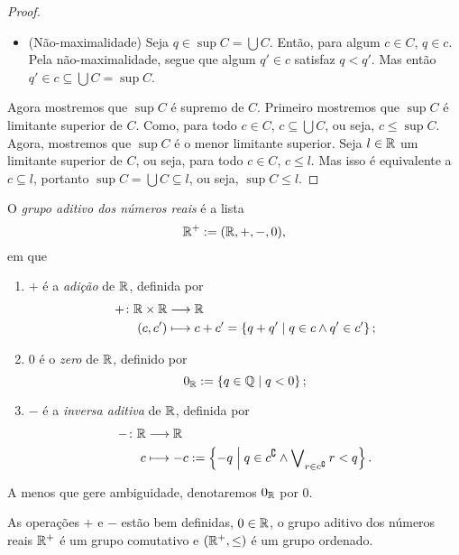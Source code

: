 \begin{proof}
\begin{itemize}
	\item (Não-maximalidade) Seja $q \in \sup C = \bigcup C$. Então, para algum $c \in C$, $q \in c$. Pela não-maximalidade, segue que algum $q' \in c$ satisfaz $q < q'$. Mas então $q' \in c \subseteq \bigcup C = \sup C$.
	\end{itemize}

Agora mostremos que $\sup C$ é supremo de $C$. Primeiro mostremos que $\sup C$ é limitante superior de $C$. Como, para todo $c \in C$, $c \subseteq \bigcup C$, ou seja, $c \leq \sup C$. Agora, mostremos que $\sup C$ é o menor limitante superior. Seja $l \in \mathbb{R}$ um limitante superior de $C$, ou seja, para todo $c \in C$, $c \leq l$. Mas isso é equivalente a $c \subseteq l$, portanto $\sup C = \bigcup C \subseteq l$, ou seja, $\sup C \leq l$.
\end{proof}

\begin{definition}
O \emph{grupo aditivo dos números reais} é a lista
	\begin{equation*}
	\mathbb{R}^+ := (\mathbb{R},+,-,0),
	\end{equation*}
em que
	\begin{enumerate}
	\item $+$ é a \emph{adição} de $\mathbb{R}$, definida por
		\begin{align*}
		{+}\colon {\mathbb{R}\times \mathbb{R}} &\longrightarrow {\mathbb{R}} \\{(c,c')} &\longmapsto c+c' = \left\{{q+q'}\;\middle\vert\;{q \in c \land q' \in c'}\right\};
		\end{align*}
	\item $0$ é o \emph{zero} de $\mathbb{R}$, definido por
		\begin{equation*}
		0_{\mathbb{R}} := \left\{{q \in \mathbb{Q}}\;\middle\vert\;{q < 0}\right\};
		\end{equation*}
	\item $-$ é a \emph{inversa aditiva} de $\mathbb{R}$, definida por
		\begin{align*}
		{-}\colon {\mathbb{R}} &\longrightarrow {\mathbb{R}} \\{c} &\longmapsto -c := \left\{{-q}\;\middle\vert\;{q \in c^\complement \land \bigvee\nolimits_{r \in c^\complement} r < q}\right\}.
		\end{align*}
	\end{enumerate}
\end{definition}

A menos que gere ambiguidade, denotaremos $0_{\mathbb{R}}$ por $0$.

\begin{exercise}
As operações $+$ e $-$ estão bem definidas, $0 \in \mathbb{R}$, o grupo aditivo dos números reais $\mathbb{R}^+$ é um grupo comutativo e $(\mathbb{R}^+,\leq)$ é um grupo ordenado.
\end{exercise}

